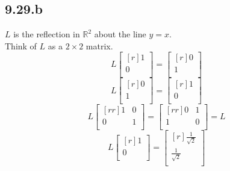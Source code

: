 \documentclass{report}
\theoremstyle{plain}
\theoremstyle{definition}
\theoremstyle{plain}
\begin{document}
\subsection{9.29.b}
$L$ is the reflection in $\mathbb{R}^2$ about the line $y=x$.\\
Think of $L$ as a $2\times 2$ matrix.
\[ L\begin{bmatrix}[r]1\\0\\\end{bmatrix} = \begin{bmatrix}[r]0\\1\\\end{bmatrix} \]
\[ L\begin{bmatrix}[r]0\\1\\\end{bmatrix} = \begin{bmatrix}[r]1\\0\\\end{bmatrix} \]
\[ L\begin{bmatrix}[rr]1&0\\0&1\\\end{bmatrix} = \begin{bmatrix}[rr]0&1\\1&0\\\end{bmatrix} = L \]
\[ L\begin{bmatrix}[r]1\\0\\\end{bmatrix} = \begin{bmatrix}[r]\frac{1}{\sqrt{2}}\\\frac{1}{\sqrt{2}}\\\end{bmatrix} \]
\end{document}
